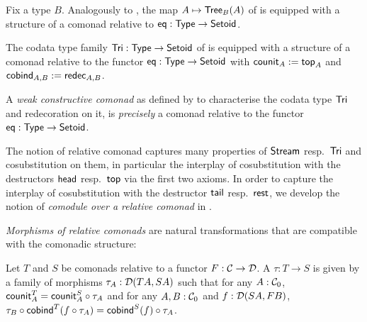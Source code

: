 \documentclass[envcountsame]{llncs}
\begin{document}
\begin{Long}

\begin{example}[Trees]\label{ex_tree_comonad}
 Fix a type $B$. Analogously to , the map $A \mapsto \Tree_B(A)$ of 
 is equipped with a structure of a comonad relative to $\eq: \Set\to\Setoid$.
\end{example}

\end{Long}

\begin{example}\label{ex:tri_comonad}
  The codata type family $\Tri : \Set \to \Setoid$ of  is equipped with a structure of a comonad relative to the functor 
  $\eq : \Set \to \Setoid$ with
   $\counit_A := \head_A$ and
   $\cobind_{A,B} := \redec_{A,B}$.
\end{example}

\begin{Long}
\begin{remark}
  A \emph{weak constructive comonad} as defined by \textcite{DBLP:conf/types/MatthesP11} to characterise the codata type $\Tri$
  and redecoration on it, is \emph{precisely}
  a comonad relative to the functor $\eq : \Set\to\Setoid$.
\end{remark}
\end{Long}

The notion of relative comonad captures many properties of $\stream$ resp.\ $\Tri$ and cosubstitution on them, in particular the interplay
of cosubstitution with the destructors $\shead$ resp.\ $\head$ via the first two axioms.
In order to  capture the interplay 
of cosubstitution  with the destructor $\stail$ resp.\ $\tail$,  we develop the notion of \emph{comodule over a relative comonad}
 in . 



\begin{Long}
\emph{Morphisms of relative comonads} are natural transformations that are compatible with the comonadic structure:
\end{Long}
\begin{definition}%
\label{def:comonad_morphism}
 Let $T$ and $S$ be comonads relative to a functor $F : \C \to \D$. A  $\tau : T \to S$
  is given by a family of morphisms $\tau_A : \D(TA,SA)$ such that for any $A : \C_0$,
     $  \counit^T_A = \comp{\tau_A}{\counit^S_A} $
   and for any $A,B : \C_0$ and $f : \D(SA,FB)$,
   $  \comp{\cobind^T(\comp{\tau_A}{f})}{\tau_B} = \comp{\tau_A}{\cobind^S(f)}$.
\end{definition}
\end{document}
